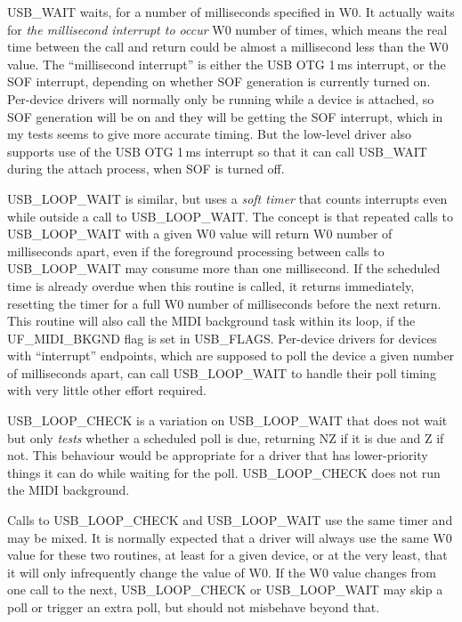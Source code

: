USB\_WAIT waits, for a number of milliseconds specified in W0.  It actually
waits for \emph{the millisecond interrupt to occur} W0 number of times,
which means the real time between the call and return could be almost a
millisecond less than the W0 value.  The ``millisecond interrupt'' is either
the USB OTG 1\,ms interrupt, or the SOF interrupt, depending on whether SOF
generation is currently turned on.  Per-device drivers will normally only be
running while a device is attached, so SOF generation will be on and they
will be getting the SOF interrupt, which in my tests seems to give more
accurate timing.  But the low-level driver also supports use of the USB OTG
1\,ms interrupt so that it can call USB\_WAIT during the attach process, when
SOF is turned off.

USB\_LOOP\_WAIT is similar, but uses a \emph{soft timer} that counts
interrupts even while outside a call to USB\_LOOP\_WAIT.  The concept is
that repeated calls to USB\_LOOP\_WAIT with a given W0 value will return W0
number of milliseconds apart, even if the foreground processing between
calls to USB\_LOOP\_WAIT may consume more than one millisecond.  If the
scheduled time is already overdue when this routine is called, it returns
immediately, resetting the timer for a full W0 number of milliseconds before
the next return.  This routine will also call the MIDI background task
within its loop, if the UF\_MIDI\_BKGND flag is set in USB\_FLAGS. 
Per-device drivers for devices with ``interrupt'' endpoints, which are
supposed to poll the device a given number of milliseconds apart, can call
USB\_LOOP\_WAIT to handle their poll timing with very little other effort
required.

USB\_LOOP\_CHECK is a variation on USB\_LOOP\_WAIT that does not wait but
only \emph{tests} whether a scheduled poll is due, returning NZ if it is due
and Z if not.  This behaviour would be appropriate for a driver that has
lower-priority things it can do while waiting for the poll. 
USB\_LOOP\_CHECK does not run the MIDI background.

Calls to USB\_LOOP\_CHECK and USB\_LOOP\_WAIT use the same timer and may be
mixed.  It is normally expected that a driver will always use the same W0
value for these two routines, at least for a given device, or at the very
least, that it will only infrequently change the value of W0.  If the W0
value changes from one call to the next, USB\_LOOP\_CHECK or USB\_LOOP\_WAIT
may skip a poll or trigger an extra poll, but should not misbehave beyond
that.

